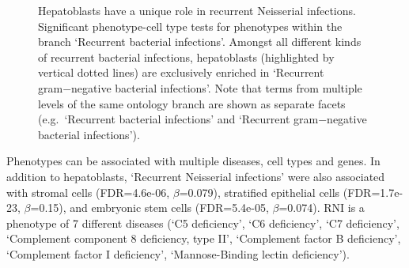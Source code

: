 \documentclass[
]{article}
\begin{document}
\label{cell-fig-rni}
\begin{figure}[H]


\caption{\label{fig-rni}Hepatoblasts have a unique role in recurrent
Neisserial infections. Significant phenotype-cell type tests for
phenotypes within the branch `Recurrent bacterial infections'. Amongst
all different kinds of recurrent bacterial infections, hepatoblasts
(highlighted by vertical dotted lines) are exclusively enriched in
`Recurrent gram−negative bacterial infections'. Note that terms from
multiple levels of the same ontology branch are shown as separate facets
(e.g.~`Recurrent bacterial infections' and `Recurrent gram−negative
bacterial infections').}

\end{figure}%

Phenotypes can be associated with multiple diseases, cell types and
genes. In addition to hepatoblasts, `Recurrent Neisserial infections'
were also associated with stromal cells (FDR=4.6e-06, \(\beta\)=0.079),
stratified epithelial cells (FDR=1.7e-23, \(\beta\)=0.15), and embryonic
stem cells (FDR=5.4e-05, \(\beta\)=0.074). RNI is a phenotype of 7
different diseases (`C5 deficiency', `C6 deficiency', `C7 deficiency',
`Complement component 8 deficiency, type II', `Complement factor B
deficiency', `Complement factor I deficiency', `Mannose-Binding lectin
deficiency').
\end{document}
